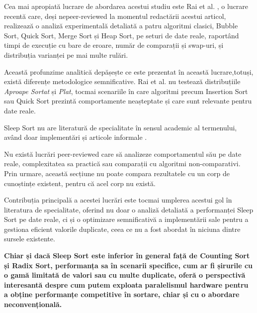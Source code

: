 \documentclass[9pt,a4paper,twocolumn,twoside]{rho-class/rho}
\begin{document}
\par Cea mai apropiată lucrare de abordarea acestui studiu este 
Rai et al. \cite{rai2025comparative}, o lucrare recentă care, deși 
nepeer-reviewed la momentul redactării acestui articol, realizează 
o analiză experimentală detaliată a patru algoritmi clasici, 
Bubble Sort, Quick Sort, Merge Sort și Heap Sort, pe seturi de 
date reale, raportând timpi de execuție cu bare de eroare, număr 
de comparații și swap-uri, și distribuția varianței pe mai multe 
rulări.

\par Această profunzime analitică depășește ce este prezentat 
în această lucrare,totuși, există diferențe metodologice semnificative. 
Rai et al. nu testează distribuțiile \textit{Aproape Sortat} 
și \textit{Plat}, tocmai scenariile în care algoritmi precum 
Insertion Sort sau Quick Sort prezintă comportamente neașteptate 
și care sunt relevante pentru date reale.


\par Sleep Sort nu are literatură de specialitate în sensul academic al termenului, având doar implementări și articole informale \cite{princeton_sleepsort, henney2023sleepsort}. 
\par Nu există lucrări peer-reviewed care să analizeze comportamentul său pe date reale, complexitatea sa practică sau comparații cu algoritmi non-comparativi.
    Prin urmare, această secțiune nu poate compara rezultatele cu un corp de cunoștințe existent, pentru că acel corp nu există.

\par Contribuția principală a acestei lucrări este tocmai umplerea acestui gol în literatura de specialitate, oferind nu doar o analiză detaliată a performanței Sleep Sort pe date reale, ci și o optimizare semnificativă a implementării sale pentru a gestiona eficient valorile duplicate, ceea ce nu a fost abordat în niciuna dintre sursele existente.
\par \textbf{Chiar și dacă Sleep Sort este inferior în general față de Counting Sort și Radix Sort, performanța sa în scenarii specifice, cum ar fi șirurile cu o gamă limitată de valori sau cu multe duplicate, oferă o perspectivă interesantă despre cum putem exploata paralelismul hardware pentru a obține performanțe competitive în sortare, chiar și cu o abordare neconvențională.}
\end{document}
